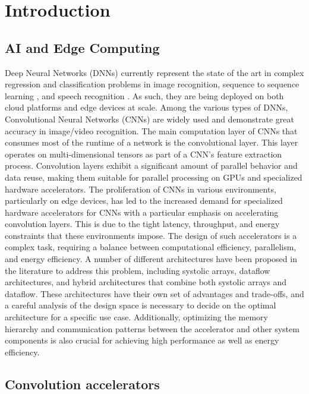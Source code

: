 
\chapter{Introduction}

\section{AI and Edge Computing}
\label{chap:intro:ai_and_edge}

Deep Neural Networks (DNNs) currently represent the state of the art in complex
regression and classification problems in image recognition, sequence to
sequence learning \cite{dnn_is_sota_seq2seq}, and speech recognition
\cite{dnn_is_sota_speech}. As such, they are being deployed on both cloud
platforms and edge devices at scale. Among the various types of DNNs,
Convolutional Neural Networks (CNNs) are widely used and demonstrate great
accuracy in image/video recognition. The main computation layer of CNNs that
consumes most of the runtime of a network is the convolutional layer. This layer
operates on multi-dimensional tensors as part of a CNN's feature extraction
process. Convolution layers exhibit a significant amount of parallel behavior
and data reuse, making them suitable for parallel processing on GPUs and
specialized hardware accelerators. The proliferation of CNNs in various
environments, particularly on edge devices, has led to the increased demand for
specialized hardware accelerators for CNNs with a particular emphasis on
accelerating convolution layers. This is due to the tight latency, throughput,
and energy constraints that these environments impose. The design of such
accelerators is a complex task, requiring a balance between computational
efficiency, parallelism, and energy efficiency. A number of different
architectures have been proposed in the literature to address this problem,
including systolic arrays, dataflow architectures, and hybrid architectures that
combine both systolic arrays and dataflow. These architectures have their own
set of advantages and trade-offs, and a careful analysis of the design space is
necessary to decide on the optimal architecture for a specific use case.
Additionally, optimizing the memory hierarchy and communication patterns between
the accelerator and other system components is also crucial for achieving high
performance as well as energy efficiency. 

\section{Convolution accelerators}
\label{chap:intro:cnn_accelerator_design_approaches}

